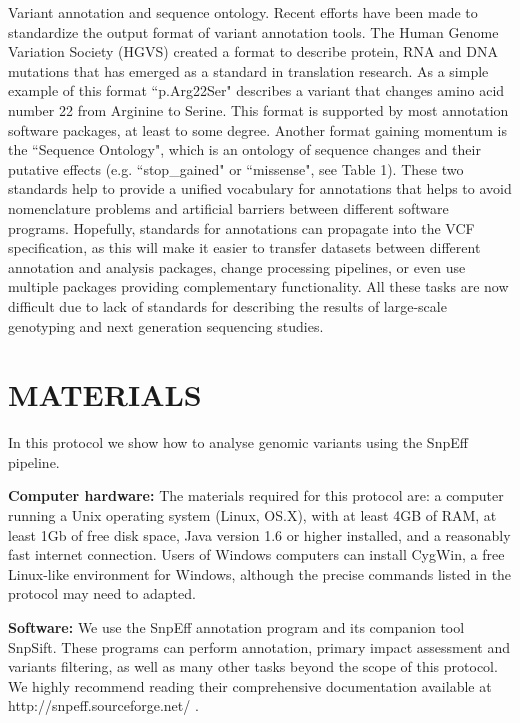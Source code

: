 \begin{framed}
{Variant annotation and sequence ontology. Recent efforts have been made to standardize the output format of variant annotation tools. The Human Genome Variation Society (HGVS) created a format to describe protein, RNA and DNA mutations that has emerged as a standard in translation research. As a simple example of this format ``p.Arg22Ser" describes a variant that changes amino acid number 22 from Arginine to Serine. This format is supported by most annotation software packages, at least to some degree. Another format gaining momentum is the ``Sequence Ontology", which is an ontology of sequence changes and their putative effects (e.g. ``stop\_gained" or ``missense", see Table 1). These two standards help to provide a unified vocabulary for annotations that helps to avoid nomenclature problems and artificial barriers between different software programs. Hopefully, standards for annotations can propagate into the VCF specification, as this will make it easier to transfer datasets between different annotation and analysis packages, change processing pipelines, or even use multiple packages providing complementary functionality. All these tasks are now difficult due to lack of standards for describing the results of large-scale genotyping and next generation sequencing studies. 
}
\end{framed}

\section{MATERIALS}

In this protocol we show how to analyse genomic variants using the SnpEff pipeline.

\textbf{Computer hardware:} The materials required for this protocol are: a computer running a Unix operating system (Linux, OS.X), with at least 4GB of RAM, at least 1Gb of free disk space, Java version 1.6 or higher installed, and a reasonably fast internet connection. Users of Windows computers can install CygWin, a free Linux-like environment for Windows, although the precise commands listed in the protocol may need to adapted.

\textbf{Software:} We use the SnpEff annotation program and its companion tool SnpSift. These programs can perform annotation, primary impact assessment and variants filtering, as well as many other tasks beyond the scope of this protocol. We highly recommend reading their comprehensive documentation available at http://snpeff.sourceforge.net/ .

